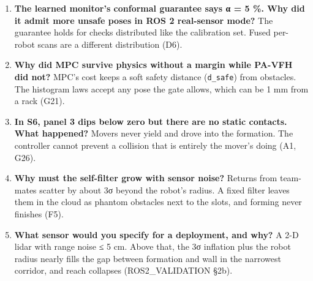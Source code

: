 \documentclass[
  10.5pt,
  a4paper,
]{article}
\begin{document}
\begin{enumerate}
  future knowledge only \emph{to make training labels}. At run time it
  sees only scans (D3, B10).
\item
  \textbf{The learned monitor's conformal guarantee says α = 5 \%. Why
  did it admit more unsafe poses in ROS 2 real-sensor mode?} The
  guarantee holds for checks distributed like the calibration set. Fused
  per-robot scans are a different distribution (D6).
\item
  \textbf{Why did MPC survive physics without a margin while PA-VFH did
  not?} MPC's cost keeps a soft safety distance (\texttt{d\_safe}) from
  obstacles. The histogram laws accept any pose the gate allows, which
  can be 1 mm from a rack (G21).
\item
  \textbf{In S6, panel 3 dips below zero but there are no static
  contacts. What happened?} Movers never yield and drove into the
  formation. The controller cannot prevent a collision that is entirely
  the mover's doing (A1, G26).
\item
  \textbf{Why must the self-filter grow with sensor noise?} Returns from
  team-mates scatter by about 3σ beyond the robot's radius. A fixed
  filter leaves them in the cloud as phantom obstacles next to the
  slots, and forming never finishes (F5).
\item
  \textbf{What sensor would you specify for a deployment, and why?} A
  2-D lidar with range noise ≤ 5 cm. Above that, the 3σ inflation plus
  the robot radius nearly fills the gap between formation and wall in
  the narrowest corridor, and reach collapses (ROS2\_VALIDATION §2b).
\end{enumerate}
\end{document}
